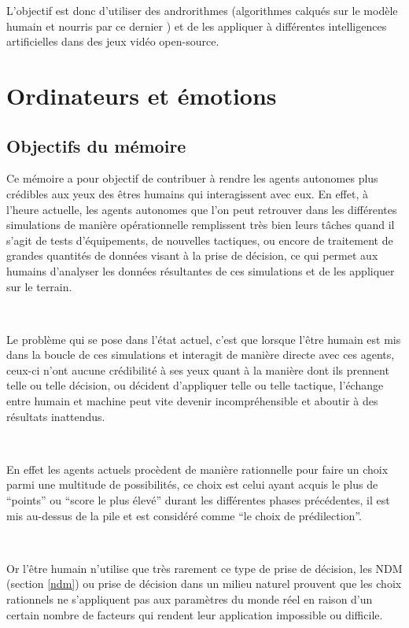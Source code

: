 L'objectif est donc d'utiliser des androrithmes (algorithmes calqués sur le modèle humain et nourris par ce dernier \parencite{humanityvstechnology}) et de les appliquer à différentes intelligences artificielles dans des jeux vidéo open-source. 


\section{Ordinateurs et émotions}

\subsection{Objectifs du mémoire}

Ce mémoire a pour objectif de contribuer à rendre les agents autonomes plus crédibles aux yeux des êtres humains qui interagissent avec eux. En effet, à l’heure actuelle, les agents autonomes que l’on peut retrouver dans les différentes simulations de manière opérationnelle remplissent très bien leurs tâches quand il s’agit de tests d’équipements, de nouvelles tactiques, ou encore de traitement de grandes quantités de données visant à la prise de décision,  ce qui permet aux humains d’analyser les données résultantes de ces simulations et de les appliquer sur le terrain.

~\par
Le problème qui se pose dans l’état actuel, c’est que lorsque l'être humain est mis dans la boucle de ces simulations et interagit de manière directe avec ces agents, ceux-ci n’ont aucune crédibilité à ses yeux quant à la manière dont ils prennent telle ou telle décision, ou décident d’appliquer telle ou telle tactique, l’échange entre humain et machine peut vite devenir incompréhensible et aboutir à des résultats inattendus.

~\par
En effet les agents actuels procèdent de manière rationnelle pour faire un choix parmi une multitude de possibilités, ce choix est celui ayant acquis le plus de “points” ou “score le plus élevé” durant les différentes phases précédentes, il est mis au-dessus de la pile et est considéré comme “le choix de prédilection”. 

~\par
Or l'être humain n’utilise que très rarement ce type de prise de décision, les NDM (section \ref{ndm}) ou prise de décision dans un milieu naturel prouvent que les choix rationnels ne s'appliquent pas aux paramètres du monde réel en raison d'un certain nombre de facteurs qui rendent leur application impossible ou difficile. 



